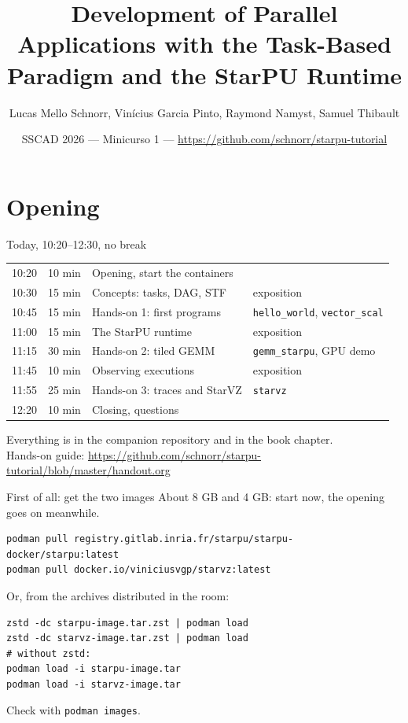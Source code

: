 \documentclass[presentation, aspectratio=169]{beamer}
\author{Lucas Mello Schnorr, Vinícius Garcia Pinto, Raymond Namyst, Samuel Thibault}
\date{SSCAD 2026 --- Minicurso 1 --- \url{https://github.com/schnorr/starpu-tutorial}}
\title{Development of Parallel Applications with the Task-Based Paradigm and the StarPU Runtime}
\begin{document}
\maketitle
\section{Opening}
\label{sec:org3a2565e}

\begin{frame}[label={sec:org9a26143},fragile]{Today, 10:20--12:30, no break}
 \begin{center}
\small
\begin{tabular}{llll}
10:20 & 10 min & Opening, start the containers & \\
10:30 & 15 min & Concepts: tasks, DAG, STF & exposition\\
10:45 & 15 min & \alert{Hands-on 1}: first programs & \texttt{hello\_world}, \texttt{vector\_scal}\\
11:00 & 15 min & The StarPU runtime & exposition\\
11:15 & 30 min & \alert{Hands-on 2}: tiled GEMM & \texttt{gemm\_starpu}, GPU demo\\
11:45 & 10 min & Observing executions & exposition\\
11:55 & 25 min & \alert{Hands-on 3}: traces and StarVZ & \texttt{starvz}\\
12:20 & 10 min & Closing, questions & \\
\end{tabular}
\end{center}

\small
Everything is in the companion repository and in the book chapter. \\
Hands-on guide: \url{https://github.com/schnorr/starpu-tutorial/blob/master/handout.org}
\end{frame}
\begin{frame}[label={sec:orgb00bf1e},fragile]{First of all: get the two images}
 About 8 GB and 4 GB: start now, the opening goes on meanwhile.

\footnotesize
\begin{verbatim}
podman pull registry.gitlab.inria.fr/starpu/starpu-docker/starpu:latest
podman pull docker.io/viniciusvgp/starvz:latest
\end{verbatim}
\normalsize

Or, from the archives distributed in the room:

\footnotesize
\begin{verbatim}
zstd -dc starpu-image.tar.zst | podman load
zstd -dc starvz-image.tar.zst | podman load
# without zstd:
podman load -i starpu-image.tar
podman load -i starvz-image.tar
\end{verbatim}
\normalsize

Check with \texttt{podman images}.
\end{frame}
\end{document}
